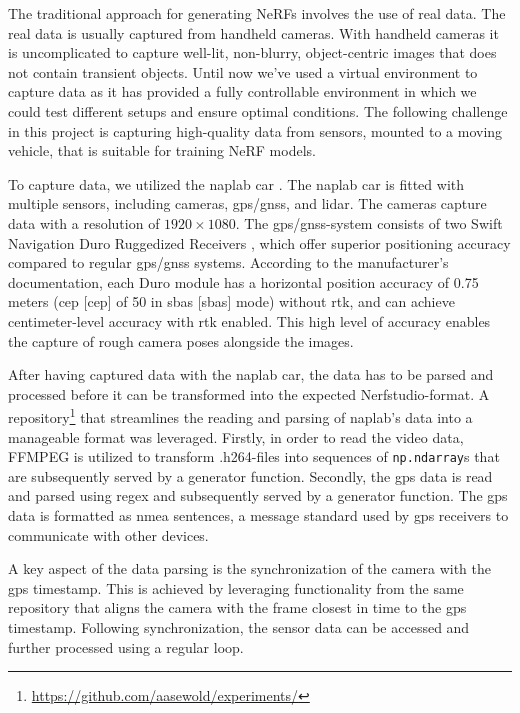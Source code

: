 The traditional approach for generating NeRFs involves the use of real data. The real data is usually captured from handheld cameras. With handheld cameras it is uncomplicated to capture well-lit, non-blurry, object-centric images that does not contain transient objects. Until now we've used a virtual environment to capture data as it has provided a fully controllable environment in which we could test different setups and ensure optimal conditions. The following challenge in this project is capturing high-quality data from sensors, mounted to a moving vehicle, that is suitable for training NeRF models.

To capture data, we utilized the \acrshort{naplab} car \cite{naplab}. The \acrshort{naplab} car is fitted with multiple sensors, including cameras, \acrshort{gps}/\acrshort{gnss}, and \acrshort{lidar}. The cameras capture data with a resolution of $1920 \times 1080$. The \acrshort{gps}/\acrshort{gnss}-system consists of two Swift Navigation Duro Ruggedized Receivers \cite{swift_navigation_duro_manual}, which offer superior positioning accuracy compared to regular \acrshort{gps}/\acrshort{gnss} systems. According to the manufacturer's documentation, each Duro module has a horizontal position accuracy of 0.75 meters (\acrlong{cep} [\acrshort{cep}] of 50 in \acrlong{sbas} [\acrshort{sbas}] mode) without \acrfull{rtk}, and can achieve centimeter-level accuracy with \acrshort{rtk} enabled. This high level of accuracy enables the capture of rough camera poses alongside the images.

After having captured data with the \acrshort{naplab} car, the data has to be parsed and processed before it can be transformed into the expected Nerfstudio-format. A repository\footnote{\url{https://github.com/aasewold/experiments/}} that streamlines the reading and parsing of \acrshort{naplab}'s data into a manageable format was leveraged. Firstly, in order to read the video data, FFMPEG is utilized to transform .h264-files into sequences of \texttt{np.ndarray}s that are subsequently served by a generator function. Secondly, the \acrshort{gps} data is read and parsed using regex and subsequently served by a generator function. The \acrshort{gps} data is formatted as \acrfull{nmea} sentences, a message standard used by \acrshort{gps} receivers to communicate with other devices. 

A key aspect of the data parsing is the synchronization of the camera with the \acrshort{gps} timestamp. This is achieved by leveraging functionality from the same repository that aligns the camera with the frame closest in time to the \acrshort{gps} timestamp. Following synchronization, the sensor data can be accessed and further processed using a regular loop.

